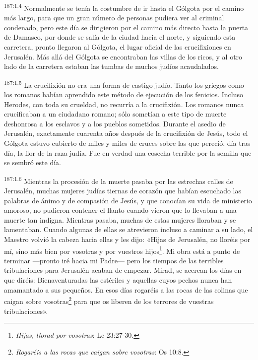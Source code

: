 \par
\textsuperscript{187:1.4} Normalmente se tenía la costumbre de ir hasta el Gólgota por el camino más largo, para que un gran número de personas pudiera ver al criminal condenado, pero este día se dirigieron por el camino más directo hasta la puerta de Damasco, por donde se salía de la ciudad hacia el norte, y siguiendo esta carretera, pronto llegaron al Gólgota, el lugar oficial de las crucifixiones en Jerusalén. Más allá del Gólgota se encontraban las villas de los ricos, y al otro lado de la carretera estaban las tumbas de muchos judíos acaudalados.

\par
\textsuperscript{187:1.5} La crucifixión no era una forma de castigo judío. Tanto los griegos como los romanos habían aprendido este método de ejecución de los fenicios. Incluso Herodes, con toda su crueldad, no recurría a la crucifixión. Los romanos nunca crucificaban a un ciudadano romano; sólo sometían a este tipo de muerte deshonrosa a los esclavos y a los pueblos sometidos. Durante el asedio de Jerusalén, exactamente cuarenta años después de la crucifixión de Jesús, todo el Gólgota estuvo cubierto de miles y miles de cruces sobre las que pereció, día tras día, la flor de la raza judía. Fue en verdad una cosecha terrible por la semilla que se sembró este día.

\par
\textsuperscript{187:1.6} Mientras la procesión de la muerte pasaba por las estrechas calles de Jerusalén, muchas mujeres judías tiernas de corazón que habían escuchado las palabras de ánimo y de compasión de Jesús, y que conocían su vida de ministerio amoroso, no pudieron contener el llanto cuando vieron que lo llevaban a una muerte tan indigna. Mientras pasaba, muchas de estas mujeres lloraban y se lamentaban. Cuando algunas de ellas se atrevieron incluso a caminar a su lado, el Maestro volvió la cabeza hacia ellas y les dijo: «Hijas de Jerusalén, no lloréis por mí, sino más bien por vosotras y por vuestros hijos\footnote{\textit{Hijas, llorad por vosotras}: Lc 23:27-30.}. Mi obra está a punto de terminar ---pronto iré hacia mi Padre--- pero los tiempos de las terribles tribulaciones para Jerusalén acaban de empezar. Mirad, se acercan los días en que diréis: Bienaventuradas las estériles y aquellas cuyos pechos nunca han amamantado a sus pequeños. En esos días rogaréis a las rocas de las colinas que caigan sobre vosotras\footnote{\textit{Rogaréis a las rocas que caigan sobre vosotras}: Os 10:8.} para que os liberen de los terrores de vuestras tribulaciones».

